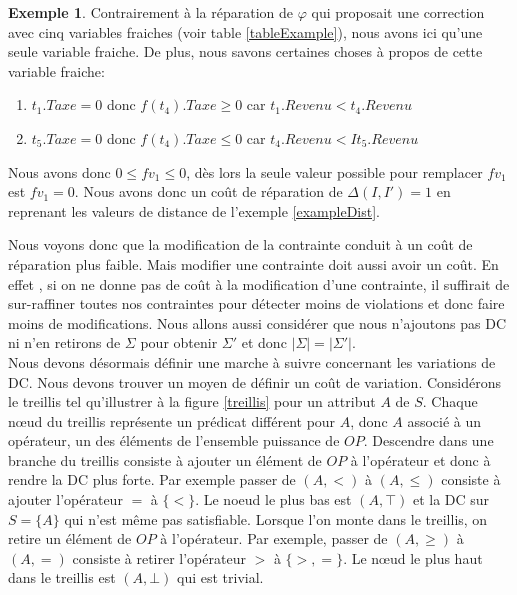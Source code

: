 \documentclass[letterpaper, 12pt]{report}
\theoremstyle{definition}
\newtheorem{myexample}{Exemple}
\begin{document}
\begin{myexample}
Contrairement à la réparation de $\varphi$ qui proposait une correction avec cinq variables fraiches (voir table \ref{tableExample}), nous avons ici qu'une seule variable fraiche. De plus, nous savons certaines choses à propos de cette variable fraiche:

\begin{enumerate}

\item $t_1.Taxe=0$ donc $f(t_4).Taxe \geq 0$ car $t_1.Revenu < t_4.Revenu$
\item $t_5.Taxe=0$ donc $f(t_4).Taxe \leq 0$ car $t_4.Revenu < It_5.Revenu$

\end{enumerate}

Nous avons donc $0 \leq fv_1 \leq 0$, dès lors la seule valeur possible pour remplacer $fv_1$ est $fv_1 = 0$. Nous avons donc un coût de réparation de $\Delta(I,I') = 1$ en reprenant les valeurs de distance de l'exemple \ref{exampleDist}.

\end{myexample}

Nous voyons donc que la modification de la contrainte conduit à un coût de réparation plus faible. Mais modifier une contrainte doit aussi avoir un coût. En effet , si on ne donne pas de coût à la modification d'une contrainte, il suffirait de sur-raffiner toutes nos contraintes pour détecter moins de violations et donc faire moins de modifications. Nous allons aussi considérer que nous n'ajoutons pas DC ni n'en retirons de $\Sigma$ pour obtenir $\Sigma'$ et donc $|\Sigma| = |\Sigma'|$.\\

Nous devons désormais définir une marche à suivre concernant les variations de DC. Nous devons trouver un moyen de définir un coût de variation. Considérons le treillis tel qu'illustrer à la figure \ref{treillis} pour un attribut $A$ de $S$. Chaque nœud du treillis représente un prédicat différent pour $A$, donc $A$ associé à un opérateur, un des éléments de l'ensemble puissance de $OP$. Descendre dans une branche du treillis consiste à ajouter un élément de $OP$ à l'opérateur et donc à rendre la DC plus forte. Par exemple passer de $(A,<)$ à $(A,\leq)$ consiste à ajouter l'opérateur $=$ à $\{ < \}$. Le noeud le plus bas est $(A,\top)$ et la DC sur $S = \{ A \}$ qui n'est même pas satisfiable. Lorsque l'on monte dans le treillis, on retire un élément de $OP$ à l'opérateur. Par exemple, passer de $(A, \geq)$ à $(A,=)$ consiste à retirer l'opérateur $>$ à $\{ >,= \}$. Le nœud le plus haut dans le treillis est $(A,\bot)$ qui est trivial.\\
\end{document}
